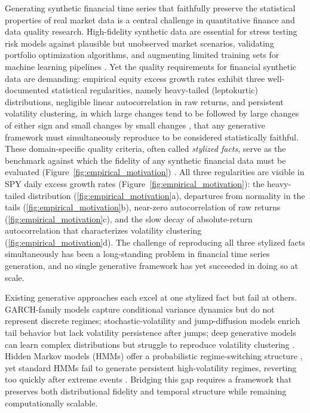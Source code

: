 Generating synthetic financial time series that faithfully preserve the statistical properties of real market data is a central challenge in quantitative finance and data quality research. High-fidelity synthetic data are essential for stress testing risk models against plausible but unobserved market scenarios, validating portfolio optimization algorithms, and augmenting limited training sets for machine learning pipelines \cite{assefa_generating_2021, jordon_synthetic_2022}. Yet the quality requirements for financial synthetic data are demanding: empirical equity excess growth rates exhibit three well-documented statistical regularities, namely heavy-tailed (leptokurtic) distributions, negligible linear autocorrelation in raw returns, and persistent volatility clustering, in which large changes tend to be followed by large changes of either sign and small changes by small changes \cite{mandelbrot_variation_1963}, that any generative framework must simultaneously reproduce to be considered statistically faithful. These domain-specific quality criteria, often called \textit{stylized facts}, serve as the benchmark against which the fidelity of any synthetic financial data must be evaluated (Figure~\ref{fig:empirical_motivation}) \cite{mandelbrot_variation_1963, cont_empirical_2001, stenger_jdiq_ts_synthesis_2024}. All three regularities are visible in SPY daily excess growth rates (Figure~\ref{fig:empirical_motivation}): the heavy-tailed distribution (\ref{fig:empirical_motivation}a), departures from normality in the tails (\ref{fig:empirical_motivation}b), near-zero autocorrelation of raw returns (\ref{fig:empirical_motivation}c), and the slow decay of absolute-return autocorrelation that characterizes volatility clustering (\ref{fig:empirical_motivation}d). The challenge of reproducing all three stylized facts simultaneously has been a long-standing problem in financial time series generation, and no single generative framework has yet succeeded in doing so at scale.

Existing generative approaches each excel at one stylized fact but fail at others. GARCH-family models \cite{engle_1982, bollerslev_garch_1986} capture conditional variance dynamics but do not represent discrete regimes; stochastic-volatility and jump-diffusion models \cite{heston_stochastic_1993, merton_jump_1976} enrich tail behavior but lack volatility persistence after jumps; deep generative models \cite{hochreiter_lstm_1997, fischer_krauss_2018, takahashi_2019, kwon_can_2024, yoon_timegan_2019} can learn complex distributions but struggle to reproduce volatility clustering \cite{stenger_jdiq_ts_synthesis_2024}. Hidden Markov models (HMMs) offer a probabilistic regime-switching structure \cite{rabiner_introduction_1986}, yet standard HMMs fail to generate persistent high-volatility regimes, reverting too quickly after extreme events \cite{ryden_stylized_1998, bulla_stylized_2006}. Bridging this gap requires a framework that preserves both distributional fidelity and temporal structure while remaining computationally scalable.


